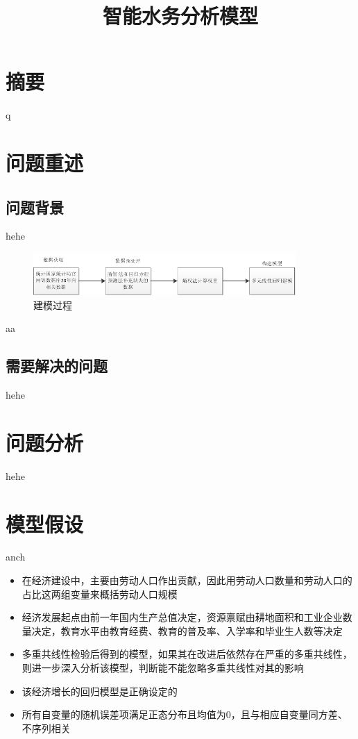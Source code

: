 \documentclass{article}
\begin{document}
	\title{\vspace{+10pt} \heiti \textbf {智能水务分析模型}}
	\songti
	\author{}
	\date{}
	\maketitle  
	\section*{\centering \textbf{摘要}}
	q \cite{NBS}
	\newpage
	\section{问题重述}
		\subsection{问题背景}
			hehe \cite{kaldor1957model}
			\begin{figure}[htb]
			\centering
			\includegraphics[width=10cm]{pictures/jmgc.png}
			\caption{建模过程}
			\label{jmgc}
			\end{figure}	
		aa\cite{ywf2017eduandeco}
		\subsection{需要解决的问题}
			hehe \cite[text]{sqf}
	\section{问题分析}	
		hehe
	\section{模型假设}
		anch
	\begin{itemize}
		\item 在经济建设中，主要由劳动人口作出贡献，因此用劳动人口数量和劳动人口的占比这两组变量来概括劳动人口规模
		\item 经济发展起点由前一年国内生产总值决定，资源禀赋由耕地面积和工业企业数量决定，教育水平由教育经费、教育的普及率、入学率和毕业生人数等决定
		\item 多重共线性检验后得到的模型，如果其在改进后依然存在严重的多重共线性，则进一步深入分析该模型，判断能不能忽略多重共线性对其的影响
		\item 该经济增长的回归模型是正确设定的
		\item 所有自变量的随机误差项满足正态分布且均值为0，且与相应自变量同方差、不序列相关
	\end{itemize}
\end{document}
